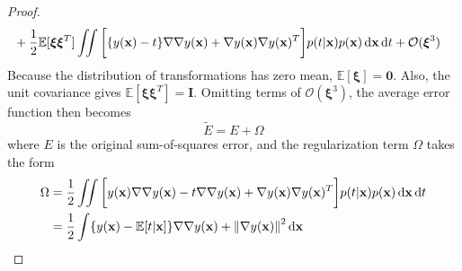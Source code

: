 \begin{proof}
\begin{align*}
        &+ \frac{1}{2}\mathbb{E}[\bm{\xi}\bm{\xi}^T] \iint \bigg[\{y(\mathbf{x}) - t\} \nabla \nabla y(\mathbf{x})
            + \nabla y(\mathbf{x}) \nabla y(\mathbf{x})^T \bigg]p(t | \mathbf{x})p(\mathbf{x})
            \mathop{}\!\mathrm{d} \mathbf{x} \mathop{}\!\mathrm{d} t + \mathcal{O}(\bm{\xi}^3)
    \end{align*}
    Because the distribution of transformations has zero mean, $\mathbb{E}[\bm{\xi}] = \bm{0}$. Also,
    the unit covariance gives $\mathbb{E}[\bm{\xi}\bm{\xi}^T] = \mathbf{I}$. Omitting terms of $\mathcal{O}(\bm{\xi}^3)$,
    the average error function then becomes
    \begin{equation}\label{eq:5.131}\tag{5.131}
        \widetilde{E} = E + \Omega
    \end{equation}
    where $E$ is the original sum-of-squares error, and the regularization term $\Omega$ takes
    the form 
    \begin{align*}
        \Omega 
        &= \frac{1}{2} \iint \bigg[y(\mathbf{x}) \nabla \nabla y(\mathbf{x}) 
            - t \nabla \nabla y(\mathbf{x}) + \nabla y(\mathbf{x}) \nabla y(\mathbf{x})^T\bigg] 
            p(t | \mathbf{x}) p(\mathbf{x}) \mathop{}\!\mathrm{d} \mathbf{x} \mathop{}\!\mathrm{d} t \\
        &= \frac{1}{2} \int \{y(\mathbf{x}) - \mathbb{E}[t | \mathbf{x}]\} 
            \nabla \nabla y(\mathbf{x}) + \norm{\nabla y(\mathbf{x})}^2 \mathop{}\!\mathrm{d} \mathbf{x}
    \end{align*}

\end{proof}

